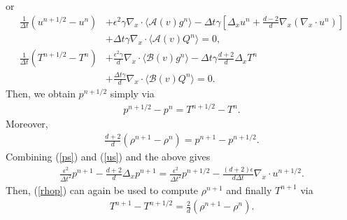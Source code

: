 \documentclass[final,11pt]{siamart251216}
\numberwithin{equation}{section}
\theoremstyle{definition}
\theoremstyle{remark}
\begin{document}
or 
%
%
\begin{align}
\label{e1}
\frac{1}{\Delta t} (u^{n+1/2} - u^{n}) &+ \epsilon^2 \gamma \nabla_x \cdot \langle \mathcal{A}(v) g^{n} \rangle - \Delta t \gamma \left[ \Delta_x u^n + \frac{d-2}{d} \nabla_x (\nabla_x \cdot u^n) \right] \nonumber \\
& + \Delta t \gamma \nabla_x \cdot \langle \mathcal{A}(v) Q^{n} \rangle = 0, \\[1.5ex]
\label{e2}
\frac{1}{\Delta t} (T^{n+1/2} - T^{n}) &+ \frac{\epsilon^2 \gamma}{d} \nabla_x \cdot \langle \mathcal{B}(v) g^{n} \rangle - \Delta t \gamma \frac{d+2}{d} \Delta_x T^{n} \nonumber \\
& + \frac{\Delta t \gamma}{d} \nabla_x \cdot \langle \mathcal{B}(v) Q^{n} \rangle = 0.
\end{align}
Then, we obtain $p^{n+1/2}$ simply via 
\begin{eqnarray}
\label{pn12}
p^{n+1/2}- p^{n}=T^{n+1/2}- T^{n}.
\end{eqnarray}
Moreover,
\begin{eqnarray}
\label{rhop}
\frac{d+2}{d} (\rho^{n+1}- \rho^{n})=p^{n+1}- p^{n+1/2}.
\end{eqnarray}
Combining (\ref{ps}) and (\ref{us}) and the above gives
\begin{eqnarray}
\label{ppoisson}
\frac{\epsilon^2}{\Delta t^2} p^{n+1}- \frac{d+2}{d}\Delta_x  p^{n+1}  = \frac{\epsilon^2}{\Delta t^2} p^{n+1/2}   - \frac{(d+2) \epsilon }{d \Delta t } \nabla_x \cdot u^{n+1/2}.
\end{eqnarray}
Then, (\ref{rhop}) can again be used to compute $\rho^{n+1}$ and finally
$T^{n+1}$ via
\begin{eqnarray}
\label{Tp}
T^{n+1}- T^{n+1/2}=\frac{2}{d} (\rho^{n+1}- \rho^{n}).
\end{eqnarray}
\end{document}
